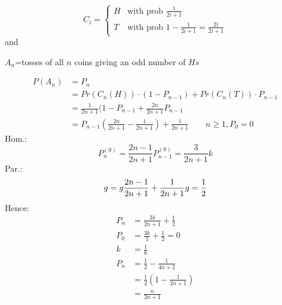 \documentclass{article}
\newcommand{\twopartdef}[4]
{
  \left\{
  \begin{array}{ll}
    #1 & \mbox{} #2 \\
    #3 & \mbox{} #4
  \end{array}
  \right.
}
\begin{document}
\[
C_i=\twopartdef{H}{\text{with prob }\frac{1}{2i+1}}{T}{\text{with prob }1-\frac{1}{2i+1}=\frac{2i}{2i+1}}
\]
and \\
\begin{center}
$A_n$={tosses of all $n$ coins giving an odd number of $Hs$}\\
\end{center}
\begin{align*}
P(A_n)&=P_n \\
&=Pr(C_n(H))\cdot (1-P_{n-1})+Pr(C_n(T))\cdot P_{n-1}\\
&=\frac{1}{2n+1}(1-P_{n-1}+\frac{2n}{2n+1}P_{n-1}\\
&=P_{n-1}(\frac{2n}{2n+1}-\frac{1}{2n+1})+\frac{1}{2n+1} \qquad n\geq 1,P_0=0 
\end{align*}
Hom.:\\
\[
P_n^{(0)}=\frac{2n-1}{2n+1}P_{n-1}^{(0)}=\frac{3}{2n+1}k
\]
Par.:\\
\[
g=g\frac{2n-1}{2n+1}+\frac{1}{2n+1} \\
g=\frac{1}{2}
\]
Hence:\\
\begin{align*}
P_n&=\frac{3k}{2n+1}+\frac{1}{2} \\
P_0&=\frac{3k}{1}+\frac{1}{2}=0\\
k&=\frac{1}{6} \\
P_n&=\frac{1}{2}-\frac{1}{4n+2} \\
&=\frac{1}{2}(1-\frac{1}{2n+1}) \\
&=\frac{n}{2n+1}
\end{align*}
\end{document}
